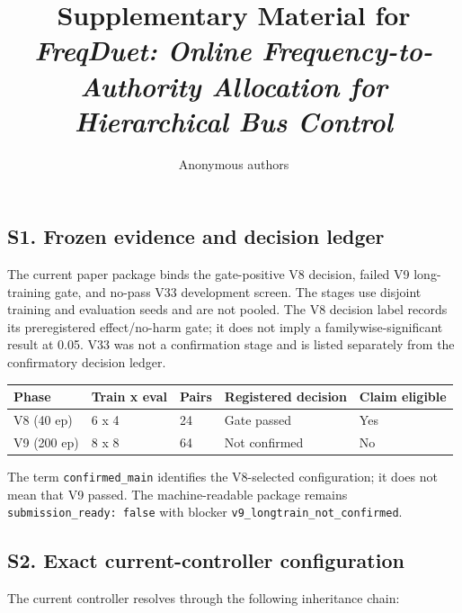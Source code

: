 \documentclass[10pt]{article}
\title{Supplementary Material for\\\textit{FreqDuet: Online
Frequency-to-Authority Allocation for Hierarchical Bus Control}}
\author{Anonymous authors}
\date{}
\begin{document}
\maketitle
\small
\setcounter{secnumdepth}{0}

\subsection{S1. Frozen evidence and decision
ledger}\label{s1.-frozen-evidence-and-decision-ledger}

The current paper package binds the gate-positive V8 decision, failed V9
long-training gate, and no-pass V33 development screen. The stages use
disjoint training and evaluation seeds and are not pooled. The V8
decision label records its preregistered effect/no-harm gate; it does
not imply a familywise-significant result at 0.05. V33 was not a
confirmation stage and is listed separately from the confirmatory
decision ledger.

{\def\LTcaptype{none} %
\begin{longtable}[]{@{}lllll@{}}
\toprule\noalign{}
Phase & Train x eval & Pairs & Registered decision & Claim eligible \\
\midrule\noalign{}
\endhead
\bottomrule\noalign{}
\endlastfoot
V8 (40 ep) & 6 x 4 & 24 & Gate passed & Yes \\
V9 (200 ep) & 8 x 8 & 64 & Not confirmed & No \\
\end{longtable}
}

The term \texttt{confirmed\_main} identifies the V8-selected
configuration; it does not mean that V9 passed. The machine-readable
package remains \texttt{submission\_ready:\ false} with blocker
\texttt{v9\_longtrain\_not\_confirmed}.

\subsection{S2. Exact current-controller
configuration}\label{s2.-exact-current-controller-configuration}

The current controller resolves through the following inheritance chain:
\end{document}
